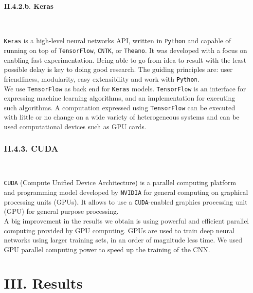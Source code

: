 \documentclass[11pt, a4papper]{report}
\theoremstyle{plain}
\theoremstyle{definition}
\theoremstyle{definition}
\theoremstyle{proposition}
\begin{document}
\subsubsection*{II.4.2.b. Keras}

\

\verb|Keras| is a high-level neural networks API, written in \verb|Python| and capable of running on top of \verb|TensorFlow|, \verb|CNTK|, or \verb|Theano|. It was developed with a focus on enabling fast experimentation. Being able to go from idea to result with the least possible delay is key to doing good research. The guiding principles are: user friendliness, modularity, easy extensibility and work with \verb|Python|.
\\

We use \verb|TensorFlow| as back end for \verb|Keras| models. \verb|TensorFlow| is an interface for expressing machine learning algorithms, and an implementation for executing such algorithms. A computation expressed using \verb|TensorFlow| can be executed with little or no change on a wide variety of heterogeneous systems and can be used computational devices such as GPU cards. 
\\

\subsection*{II.4.3. CUDA}

\

\verb|CUDA| (Compute Unified Device Architecture) is a parallel computing platform and programming model developed by \verb|NVIDIA| for general computing on graphical processing units (GPUs). It allows to use a \verb|CUDA|-enabled graphics processing unit (GPU) for general purpose processing.
\\

A big improvement in the results we obtain is using powerful and efficient parallel computing provided by GPU computing. GPUs are used to train deep neural networks using larger training sets, in an order of magnitude less time. We used GPU parallel computing power to speed up the training of the CNN.
\\

\newpage

\chapter*{III. Results}
\end{document}
